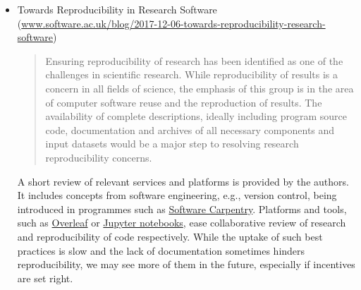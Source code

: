\documentclass[11pt,letterpaper]{article}
\newcommand{\katznote}[1]{ {\textcolor{magenta}    { ***Dan: #1 }}}
\newcommand{\LXnote}[1]{  {\textcolor{orange}      { ***Alex: #1 }}}
\begin{document}
\begin{itemize}


\item Towards Reproducibility in Research Software (\href{https://www.software.ac.uk/blog/2017-12-06-towards-reproducibility-research-software}{www.software.ac.uk/blog/2017-12-06-towards-reproducibility-research-software})
\begin{quote}
Ensuring reproducibility of research has been identified as one of the challenges in scientific research. While reproducibility of results is a concern in all fields of science, the emphasis of this group is in the area of computer software reuse and the reproduction of results. The availability of complete descriptions, ideally including program source code, documentation and archives of all necessary components and input datasets would be a major step to resolving research reproducibility concerns.
\end{quote}
A short review of relevant services and platforms is provided by the authors. It includes concepts from software engineering, e.g., version control, being introduced in programmes such as \href{https://software-carpentry.org}{Software Carpentry}.  %
Platforms and tools, such as \href{https://www.overleaf.com}{Overleaf} or \href{http://jupyter.org}{Jupyter notebooks}, ease collaborative review of research and reproducibility of code respectively. While the uptake of such best practices is slow and the lack of documentation sometimes hinders reproducibility, we may see more of them in the future, especially if incentives are set right.


\end{itemize}
\end{document}
